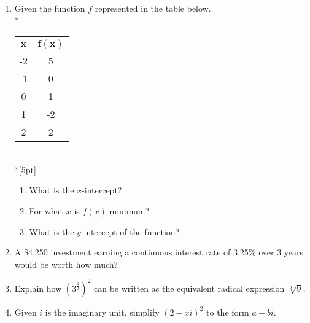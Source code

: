 \documentclass[12pt, oneside]{article}
\begin{document}
\begin{enumerate}
\item Given the function $f$ represented in the table below.\\*
\begin{center}
\begin{tabular}{|c|c|}
    \hline 
    $\boldsymbol{x}$ & $\boldsymbol{f(x)}$\\ 
    \hline 
    -2 & 5 \\ 
    \hline 
    -1 & 0 \\ 
    \hline 
    0 & 1 \\ 
    \hline 
    1 & -2 \\ 
    \hline 
    2 & 2 \\ 
    \hline 
\end{tabular}\\*[5pt]
\end{center}
\begin{enumerate}
    \item What is the $x$-intercept?\\[25pt]
    \item For what $x$ is $f(x)$ minimum?\\[25pt]
    \item What is the $y$-intercept of the function?\\[15pt]
\end{enumerate}

\newpage

\item A \$4,250 investment earning a continuous interest rate of 3.25\% over 3 years would be worth how much?\\[2in]


\item Explain how $\displaystyle \left(3^{\frac{1}{3}} \right)^2$ can be written as the equivalent radical expression $\sqrt[3]9$. \\[3in] %

\item Given $i$ is the imaginary unit, simplify $(2-xi)^2$ to the form $a+bi$. \\[1.8in]%

\newpage


\end{enumerate}
\end{document}
